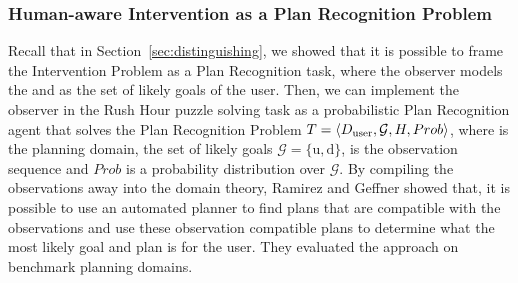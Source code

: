\begin{table}[pbt]
%
\caption{Precision, Recall and F-scores for the prediction accuracy of the Human-aware Intervention learned models. Best values are in bold. $k$ = number of moves remaining until the forbidden vehicle is moved}
\label{tab:rupsraccuracy}
\end{table}



\subsubsection{Human-aware Intervention as a Plan Recognition Problem}
Recall that in Section~\ref{sec:distinguishing}, we showed that it is possible to frame the Intervention Problem as a Plan Recognition task, where the observer models the \undesired and \desired as the set of likely goals of the user.
Then, we can implement the observer in the Rush Hour puzzle solving task as a probabilistic Plan Recognition agent that solves the Plan Recognition Problem $T=\langle D_{\textnormal{user}}, \mathcal{G}, H, Prob \rangle$, where \domainUser is the planning domain, the set of likely goals $\mathcal{G}=\lbrace \mathrm{u},\mathrm{d}\rbrace$, \historyDef is the observation sequence and $Prob$ is a probability distribution over $\mathcal{G}$. 
By compiling the observations away into the domain theory, Ramirez and Geffner showed that, it is possible to use an automated planner to find plans that are compatible with the observations and use these observation compatible plans to determine what the most likely goal and plan \cite{ramirez2010probabilistic} is for the user. 
They evaluated the approach on benchmark planning domains.

